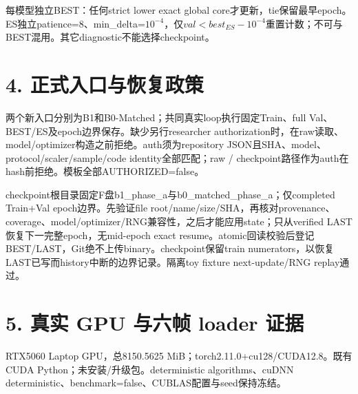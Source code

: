 \documentclass[10pt,a4paper,fontset=windows]{ctexart}
\begin{document}
每模型独立BEST：任何strict lower exact global core才更新，tie保留最早epoch。ES独立patience=8、min\_delta=$10^{-4}$，仅$val<best_{ES}-10^{-4}$重置计数；不可与BEST混用。其它diagnostic不能选择checkpoint。

\section*{4. 正式入口与恢复政策}
两个新入口分别为B1和B0-Matched；共同真实loop执行固定Train、full Val、BEST/ES及epoch边界保存。缺少另行researcher authorization时，在raw读取、model/optimizer构造之前拒绝。auth须为repository JSON且SHA、model、protocol/scaler/sample/code identity全部匹配；raw / checkpoint路径作为auth在hash前拒绝。模板全部AUTHORIZED=false。

checkpoint根目录固定F盘b1\_phase\_a与b0\_matched\_phase\_a；仅completed Train+Val epoch边界。先验证file root/name/size/SHA，再核对provenance、coverage、model/optimizer/RNG兼容性，之后才能应用state；只从verified LAST恢复下一完整epoch，无mid-epoch exact resume。atomic回读校验后登记BEST/LAST，Git绝不上传binary。checkpoint保留train numerators，以恢复LAST已写而history中断的边界记录。隔离toy fixture next-update/RNG replay通过。
\newpage
\section*{5. 真实 GPU 与六帧 loader 证据}
RTX5060 Laptop GPU，总8150.5625 MiB；torch2.11.0+cu128/CUDA12.8。既有CUDA Python；未安装/升级包。deterministic algorithms、cuDNN deterministic、benchmark=false、CUBLAS配置与seed保持冻结。
\end{document}
